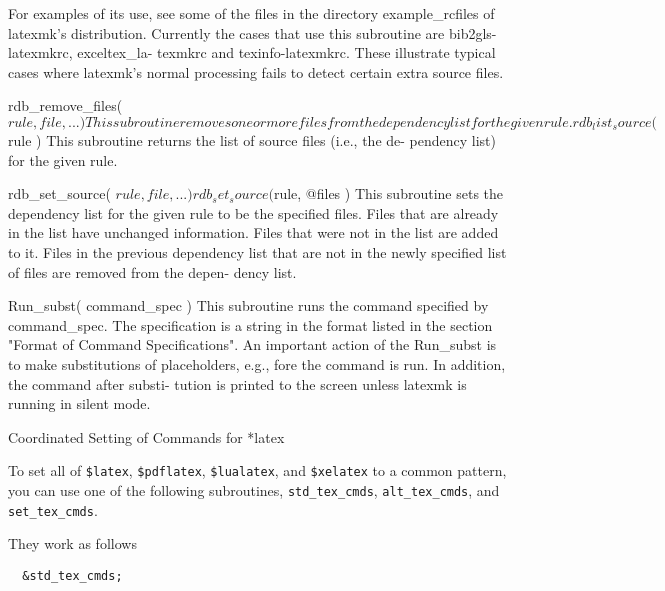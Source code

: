               For  examples of its use, see some of the files in the directory
              example_rcfiles of latexmk's distribution.  Currently the  cases
              that  use  this  subroutine  are bib2gls-latexmkrc, exceltex_la-
              texmkrc and texinfo-latexmkrc.  These illustrate  typical  cases
              where  latexmk's normal processing fails to detect certain extra
              source files.

       rdb_remove_files( $rule, file, ... )
              This subroutine removes one or more files  from  the  dependency
              list for the given rule.

       rdb_list_source( $rule )
              This  subroutine returns the list of source files (i.e., the de-
              pendency list) for the given rule.

       rdb_set_source( $rule, file, ... )

       rdb_set_source( $rule, @files )
              This subroutine sets the dependency list for the given  rule  to
              be the specified files.  Files that are already in the list have
              unchanged information.  Files that were  not  in  the  list  are
              added to it.  Files in the previous dependency list that are not
              in the newly specified list of files are removed from the depen-
              dency list.

       Run_subst( command_spec )
              This subroutine runs the command specified by command_spec.  The
              specification is a string in the format listed  in  the  section
              "Format  of Command Specifications".  An important action of the
              Run_subst is to make substitutions of placeholders, e.g., %
              fore the command is run.  In addition, the command after substi-
              tution  is  printed  to  the screen unless latexmk is running in
              silent mode.


Coordinated Setting of Commands for *latex

To set all of \verb|$latex|, \verb|$pdflatex|, \verb|$lualatex|, and \verb|$xelatex|  to  a  common
pattern,  you  can  use one of the following subroutines, \verb|std_tex_cmds|,
\verb|alt_tex_cmds|, and \verb|set_tex_cmds|.

They work as follows

\begin{verbatim}
  &std_tex_cmds;
\end{verbatim}

